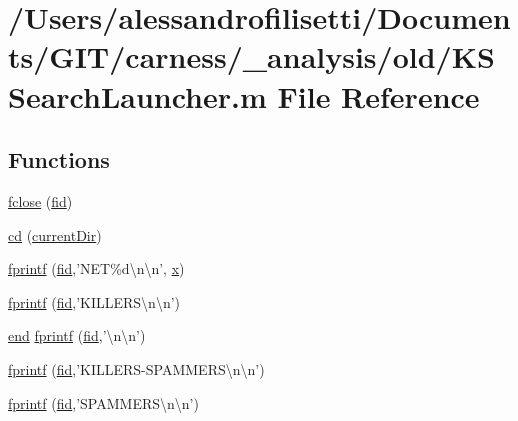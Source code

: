 \hypertarget{a00031}{\section{/\+Users/alessandrofilisetti/\+Documents/\+G\+I\+T/carness/\+\_\+analysis/old/\+K\+S\+Search\+Launcher.m File Reference}
\label{a00031}
}
\subsection*{Functions}
\begin{DoxyCompactItemize}
\item 
\hyperlink{a00031_a5e769bbbabcaddc548203741c7100228}{fclose} (\hyperlink{a00031_ae9011d40c6f13e68e6f07156e0da7c5d}{fid})
\item 
\hyperlink{a00031_a4241e59001a956990321a269c236c993}{cd} (\hyperlink{a00031_af32eb97339f1e9d37b5540de2cbc79c9}{current\+Dir})
\item 
\hyperlink{a00031_a21172d88d238291f06b91067ea53f814}{fprintf} (\hyperlink{a00031_ae9011d40c6f13e68e6f07156e0da7c5d}{fid},'N\+E\+T\%d\textbackslash{}n\textbackslash{}n', \hyperlink{a00031_a7265972fe485274cfff77a9bb07b8fce}{x})
\item 
\hyperlink{a00031_a2bff3632fad7bca512140377cbce79ef}{fprintf} (\hyperlink{a00031_ae9011d40c6f13e68e6f07156e0da7c5d}{fid},'K\+I\+L\+L\+E\+R\+S\textbackslash{}n\textbackslash{}n')
\item 
\hyperlink{a00025_afb358f48b1646c750fb9da6c6585be2b}{end} \hyperlink{a00031_a0921b3966bd3417e73b391d1e3d61c72}{fprintf} (\hyperlink{a00031_ae9011d40c6f13e68e6f07156e0da7c5d}{fid},'\textbackslash{}n\textbackslash{}n')
\item 
\hyperlink{a00031_a4b2068e6157d1e5aeba754398e689fec}{fprintf} (\hyperlink{a00031_ae9011d40c6f13e68e6f07156e0da7c5d}{fid},'K\+I\+L\+L\+E\+R\+S-\/S\+P\+A\+M\+M\+E\+R\+S\textbackslash{}n\textbackslash{}n')
\item 
\hyperlink{a00031_a194b6c53d0062802894434f7555c8e40}{fprintf} (\hyperlink{a00031_ae9011d40c6f13e68e6f07156e0da7c5d}{fid},'S\+P\+A\+M\+M\+E\+R\+S\textbackslash{}n\textbackslash{}n')
\end{DoxyCompactItemize}
